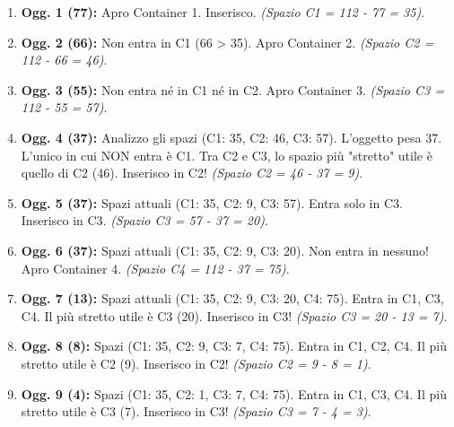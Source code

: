 \documentclass[12pt, a4paper]{article}
\begin{document}
	\begin{enumerate}
		\item \textbf{Ogg. 1 (77):} Apro Container 1. Inserisco. \textit{(Spazio C1 = 112 - 77 = 35)}.
		\item \textbf{Ogg. 2 (66):} Non entra in C1 (66 > 35). Apro Container 2. \textit{(Spazio C2 = 112 - 66 = 46)}.
		\item \textbf{Ogg. 3 (55):} Non entra né in C1 né in C2. Apro Container 3. \textit{(Spazio C3 = 112 - 55 = 57)}.
		\item \textbf{Ogg. 4 (37):} Analizzo gli spazi (C1: 35, C2: 46, C3: 57). L'oggetto pesa 37. L'unico in cui NON entra è C1. Tra C2 e C3, lo spazio più "stretto" utile è quello di C2 (46). Inserisco in C2! \textit{(Spazio C2 = 46 - 37 = 9)}.
		\item \textbf{Ogg. 5 (37):} Spazi attuali (C1: 35, C2: 9, C3: 57). Entra solo in C3. Inserisco in C3. \textit{(Spazio C3 = 57 - 37 = 20)}.
		\item \textbf{Ogg. 6 (37):} Spazi attuali (C1: 35, C2: 9, C3: 20). Non entra in nessuno! Apro Container 4. \textit{(Spazio C4 = 112 - 37 = 75)}.
		\item \textbf{Ogg. 7 (13):} Spazi attuali (C1: 35, C2: 9, C3: 20, C4: 75). Entra in C1, C3, C4. Il più stretto utile è C3 (20). Inserisco in C3! \textit{(Spazio C3 = 20 - 13 = 7)}.
		\item \textbf{Ogg. 8 (8):} Spazi (C1: 35, C2: 9, C3: 7, C4: 75). Entra in C1, C2, C4. Il più stretto utile è C2 (9). Inserisco in C2! \textit{(Spazio C2 = 9 - 8 = 1)}.
		\item \textbf{Ogg. 9 (4):} Spazi (C1: 35, C2: 1, C3: 7, C4: 75). Entra in C1, C3, C4. Il più stretto utile è C3 (7). Inserisco in C3! \textit{(Spazio C3 = 7 - 4 = 3)}.
	\end{enumerate}
	
\end{document}
